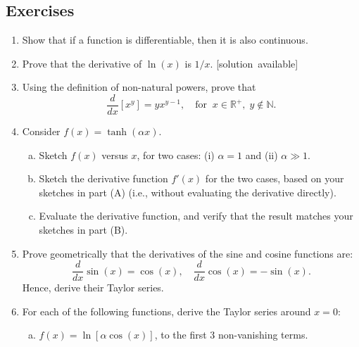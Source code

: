 \documentclass[10pt,a4paper]{article}
\begin{document}
\subsection{Exercises}\label{exercises}

\begin{enumerate}
\item
  Show that if a function is differentiable, then it is also
  continuous.

\item
  Prove that the derivative of $\ln(x)$ is $1/x$.
  \hfill{\scriptsize [solution~available]}

\item
  Using the definition of non-natural powers, prove that
  \begin{equation}
    \frac{d}{dx} [x^y] = y x^{y-1},
    \quad\mathrm{for}\;\;x \in \mathbb{R}^+, \; y \notin \mathbb{N}.
  \end{equation}

\item
  Consider $f(x) = \tanh(\alpha x)$.

  \begin{enumerate}[(a)]
  \item
    Sketch $f(x)$ versus $x$, for two cases: (i) $\alpha = 1$ and
    (ii) $\alpha \gg 1$.

  \item
    Sketch the derivative function $f'(x)$ for the two cases, based on
    your sketches in part (A) (i.e., without evaluating the derivative
    directly).

  \item
    Evaluate the derivative function, and verify that the result matches
    your sketches in part (B).
  \end{enumerate}

\item
  Prove geometrically that the derivatives of the sine and cosine
  functions are:
  \begin{equation}
    \frac{d}{dx}\sin(x) = \cos(x), \quad\frac{d}{dx}\cos(x) = -\sin(x).
  \end{equation}
  Hence, derive their Taylor series.

\item
  For each of the following functions, derive the Taylor series around
  $x = 0$:

  \begin{enumerate}[(a)]
  \item
    $f(x) = \ln\left[\alpha \cos(x)\right]$, to the first 3
    non-vanishing terms.


\end{enumerate}
\end{enumerate}
\end{document}
